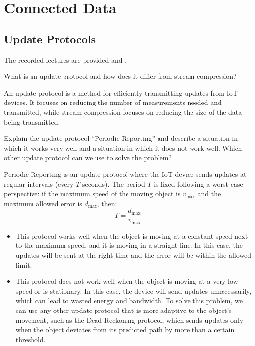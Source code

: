 \section{Connected Data}



\subsection{Update Protocols}

The recorded lectures are provided  and .

\begin{ejercicio}
    What is an update protocol and how does it differ from stream compression?

    An update protocol is a method for efficiently transmitting updates from IoT devices. It focuses on reducing the number of measurements needed and transmitted, while stream compression focuses on reducing the size of the data being transmitted.
\end{ejercicio}

\begin{ejercicio}
    Explain the update protocol ``Periodic Reporting'' and describe a situation in which it works very well and a situation in which it does not work well. Which other update protocol can we use to solve the problem?

    Periodic Reporting is an update protocol where the IoT device sends updates at regular intervals (every $T$ seconds). The period $T$ is fixed following a worst-case perspective: if the maximum speed of the moving object is $v_{\max}$ and the maximum allowed error is $d_{\max}$, then:
\[
T = \frac{d_{\max}}{v_{\max}}
\]
    \begin{itemize}
        \item This protocol works well when the object is moving at a constant speed next to the maximum speed, and it is moving in a straight line. In this case, the updates will be sent at the right time and the error will be within the allowed limit.
        \item This protocol does not work well when the object is moving at a very low speed or is stationary. In this case, the device will send updates unnecessarily, which can lead to wasted energy and bandwidth. To solve this problem, we can use any other update protocol that is more adaptive to the object's movement, such as the Dead Reckoning protocol, which sends updates only when the object deviates from its predicted path by more than a certain threshold.
    \end{itemize}
\end{ejercicio}

